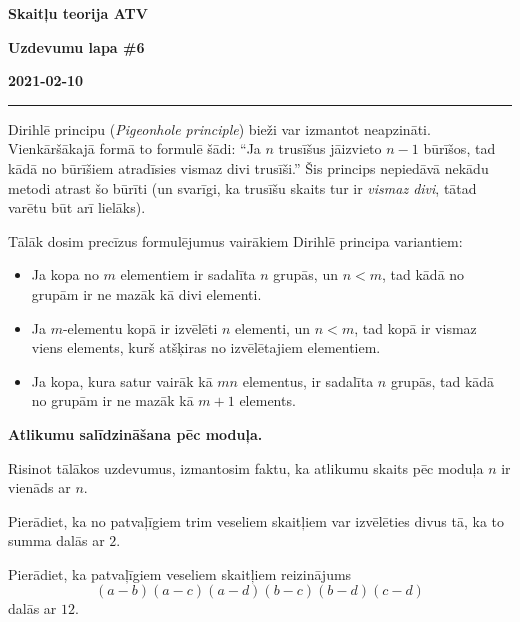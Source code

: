 \documentclass[a4paper,12pt]{article}
\begin{document}
\clearpage
\begin{center}
\parbox{3.5cm}{\flushleft\bf Skaitļu teorija \newline ATV} \hfill {\bf\LARGE Uzdevumu lapa \#6} \hfill \parbox{3.5cm}{\flushright\bf 2021-02-10} %
\end{center}

\hrule


\vspace{20pt}
Dirihlē principu ({\em Pigeonhole principle}) bieži var izmantot neapzināti. 
Vienkāršākajā formā to formulē šādi: ``Ja $n$ trusīšus jāizvieto $n-1$ būrīšos, tad kādā no būrīšiem atradīsies vismaz divi trusīši.''
Šis princips nepiedāvā nekādu metodi atrast šo būrīti (un svarīgi, ka trusīšu skaits tur ir {\em vismaz divi}, tātad varētu būt arī lielāks).

Tālāk dosim precīzus formulējumus vairākiem Dirihlē principa variantiem:
\begin{itemize}
\item Ja kopa no $m$ elementiem ir sadalīta $n$ grupās, un  $n<m$, tad kādā no grupām ir ne mazāk kā divi elementi.
\item Ja $m$-elementu kopā ir izvēlēti $n$ elementi, un $n<m$, tad kopā ir vismaz viens elements, kurš atšķiras no izvēlētajiem elementiem.
\item Ja kopa, kura satur vairāk kā $mn$ elementus, ir sadalīta $n$ grupās, tad kādā no grupām ir ne mazāk kā $m+1$ elements.
\end{itemize}

\vspace{20pt}
{\bf Atlikumu salīdzināšana pēc moduļa.}

\vspace{10pt}
Risinot tālākos uzdevumus, izmantosim faktu, ka atlikumu skaits pēc moduļa $n$ ir vienāds ar $n$.


\vspace{10pt}
\begin{problem}
Pierādiet, ka no patvaļīgiem trim veseliem skaitļiem var izvēlēties divus tā, ka to summa dalās ar $2$.
\end{problem}

\vspace{10pt}
\begin{problem}
Pierādiet, ka patvaļīgiem veseliem skaitļiem  reizinājums
\[ (a-b)(a-c)(a-d)(b-c)(b-d)(c-d) \]
dalās ar $12$.
\end{problem}
\end{document}
